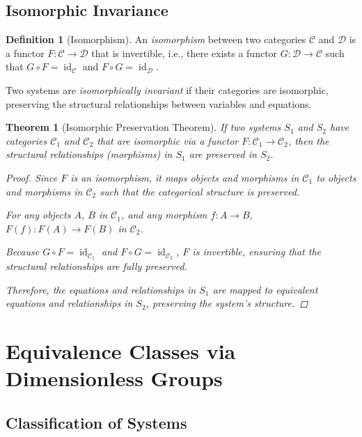 \documentclass{article}
\newtheorem{theorem}{Theorem}[section]
\theoremstyle{definition}
\newtheorem{definition}{Definition}[section]
\theoremstyle{remark}
\begin{document}
	\subsection{Isomorphic Invariance}
	
	\begin{definition}[Isomorphism]
		An \emph{isomorphism} between two categories $\mathcal{C}$ and $\mathcal{D}$ is a functor $F: \mathcal{C} \rightarrow \mathcal{D}$ that is invertible, i.e., there exists a functor $G: \mathcal{D} \rightarrow \mathcal{C}$ such that $G \circ F = \operatorname{id}_{\mathcal{C}}$ and $F \circ G = \operatorname{id}_{\mathcal{D}}$.
		
		Two systems are \emph{isomorphically invariant} if their categories are isomorphic, preserving the structural relationships between variables and equations.
	\end{definition}
	
	\begin{theorem}[Isomorphic Preservation Theorem]
		If two systems $S_1$ and $S_2$ have categories $\mathcal{C}_1$ and $\mathcal{C}_2$ that are isomorphic via a functor $F: \mathcal{C}_1 \rightarrow \mathcal{C}_2$, then the structural relationships (morphisms) in $S_1$ are preserved in $S_2$.
		
		\begin{proof}
			Since $F$ is an isomorphism, it maps objects and morphisms in $\mathcal{C}_1$ to objects and morphisms in $\mathcal{C}_2$ such that the categorical structure is preserved.
			
			For any objects $A$, $B$ in $\mathcal{C}_1$, and any morphism $f: A \rightarrow B$, $F(f): F(A) \rightarrow F(B)$ in $\mathcal{C}_2$.
			
			Because $G \circ F = \operatorname{id}_{\mathcal{C}_1}$ and $F \circ G = \operatorname{id}_{\mathcal{C}_2}$, $F$ is invertible, ensuring that the structural relationships are fully preserved.
			
			Therefore, the equations and relationships in $S_1$ are mapped to equivalent equations and relationships in $S_2$, preserving the system's structure.
		\end{proof}
	\end{theorem}
	
	\section{Equivalence Classes via Dimensionless Groups}
	
	\subsection{Classification of Systems}
	
\end{document}
